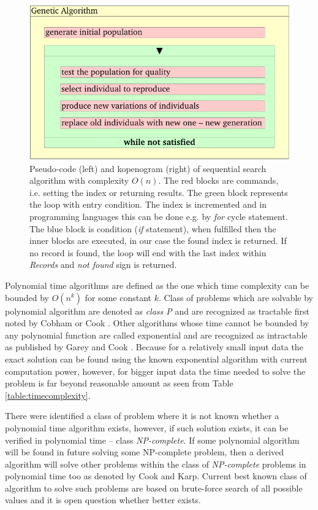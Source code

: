 \begin{figure}[ht]
    \centering
    \includegraphics[page=3]{chapter3/GA-kopenogram-crop.pdf}    
    \caption{Pseudo-code (left) and kopenogram (right) of sequential search algorithm with complexity $O(n)$. The red blocks are commands, i.e. setting the index or returning results. The green block represents the loop with entry condition. The index is incremented and in programming languages this can be done e.g. by \emph{for} cycle statement. The blue block is condition (\emph{if} statement), when fulfilled then the inner blocks are executed, in our case the found index is returned. If no record is found, the loop will end with the last index within \emph{Records} and \emph{not found} sign is returned. }
    \label{fig:search}
\end{figure}

Polynomial time algorithms are defined as the one which time complexity can be bounded by $O(n^k)$ for some constant $k$. Class of problems which are solvable by polynomial algorithm are denoted as \emph{class P} and are recognized as tractable first noted by Cobham or Cook \cite{Cobham1964,Cook1983}. Other algorithms whose time cannot be bounded by any polynomial function are called exponential and are recognized as intractable as published by Garey and Cook \cite{Garey1979,Cook1983}. Because for a relatively small input data the exact solution can be found using the known exponential algorithm with current computation power, however, for bigger input data the time needed to solve the problem is far beyond reasonable amount as seen from Table \ref{table:timecomplexity}.

There were identified a class of problem where it is not known whether a polynomial time algorithm exists, however, if such solution exists, it can be verified in polynomial time -- class \emph{NP-complete}. If some polynomial algorithm will be found in future solving some NP-complete problem, then a derived algorithm will solve other problems within the class of \emph{NP-complete} problems in polynomial time too as denoted by Cook and Karp\cite{Cook1971,Karp1972}. Current best known class of algorithm to solve such problems are based on brute-force search of all possible values and it is open question whether better exists. 

